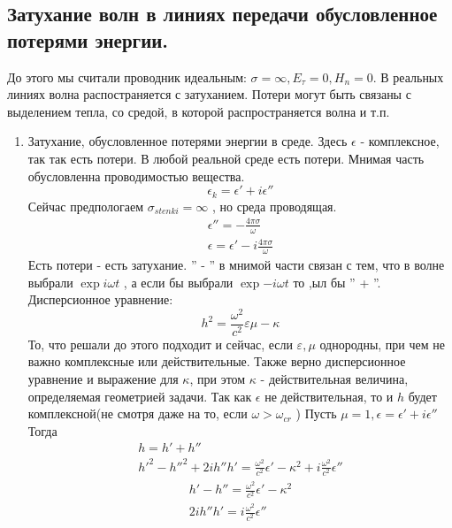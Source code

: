 \subsection{Затухание волн в линиях передачи обусловленное потерями энергии.}
До этого мы считали проводник идеальным: $\sigma = \infty, E_{\tau} = 0, H_n = 0$.
%
В реальных линиях волна распостраняется с затуханием. Потери могут быть связаны с выделением тепла, со средой, в которой распространяется волна и т.п.
%
\begin{enumerate}
	\item Затухание, обусловленное потерями энергии в среде.
	Здесь $\epsilon$ - комплексное, так так есть потери. В любой реальной среде есть потери. Мнимая часть обусловленна проводимостью вещества.
	\begin{equation}
		\epsilon_{k} = \epsilon' + i \epsilon''
	\end{equation}
	Сейчас предпологаем $\sigma_{stenki} = \infty$ , но среда проводящая.
	\begin{gather}
		\epsilon'' = - \frac{4 \pi \sigma}{\omega}\\
		\epsilon = \epsilon' - i \frac{4 \pi \sigma}{\omega}
	\end{gather}
	Есть потери - есть затухание. '' - '' в мнимой части связан с тем, что в волне выбрали $\exp{ i \omega t}$ , а если бы выбрали $\exp{- i \omega t}$ то ,ыл бы '' + ''.
	Дисперсионное уравнение:
	\begin{equation}
		h^2= \frac{\omega^2}{c^2}{\varepsilon \mu} -\kappa
	\end{equation}
	То, что решали до этого подходит и сейчас, если $\varepsilon, \mu$ однородны, при чем не важно комплексные или действительные.
	Также верно дисперсионное уравнение и выражение для $\kappa$, при этом $\kappa$ - действительная величина, определяемая геометрией задачи. Так как $\epsilon$ не действительная, то и $h$   будет комплексной(не смотря даже на то, если $\omega > \omega_{cr}$ )
	Пусть $\mu = 1, \epsilon = \epsilon' + i \epsilon''$
	Тогда 
	\begin{gather}
		h = h' + h''\\
		h'^2 - h''^2 + 2 i h'' h' = \frac{\omega^2}{c^2} \epsilon' - \kappa^2 + i \frac{\omega^2}{c^2} \epsilon''
	\end{gather}
	\begin{gather}
		h' - h'' = \frac{\omega^2}{c^2} \epsilon' - \kappa^2\\
		2 i h'' h' = i \frac{\omega^2}{c^2} \epsilon''
	\end{gather}

\end{enumerate}

